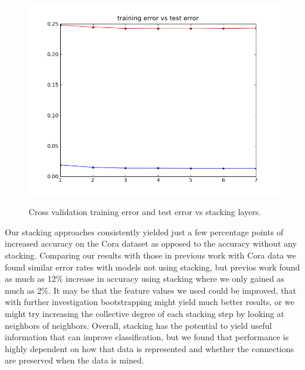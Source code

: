 \documentclass[a4paper,11pt]{article}
\begin{document}
\begin{figure}[!ht]
  \caption{Cross validation training error and test error vs stacking layers.}
  \centering
  \includegraphics[width=4.5in]{WU5/CrossValidation.png}
  \label{figures:f3}
\end{figure}

\newpage

Our stacking approaches consistently yielded just a few percentage points of
increased accuracy on the Cora dataset as opposed to the accuracy without any stacking. 
Comparing our results with those in previous work with Cora data \footnotemark[\value{footnote}]
we found similar error rates with models not using stacking, but previos work found as much as
12\% increase in accuracy using stacking where we only gained as much as 2\%. It may be that the
feature values we used could be improved, that with further investigation bootstrapping might yield
much better results, or we might try increasing the collective degree of each stacking step by 
looking at neighbors of neighbors. Overall, stacking has the potential to yield useful information
that can improve classification, but we found that performance is highly dependent on how that data is represented and whether
the connections are preserved when the data is mined.
\end{document}

